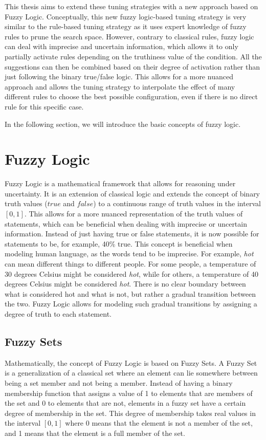 This thesis aims to extend these tuning strategies with a new approach based on Fuzzy Logic. Conceptually, this new fuzzy logic-based tuning strategy is very similar to the rule-based tuning strategy as it uses expert knowledge of fuzzy rules to prune the search space. However, contrary to classical rules, fuzzy logic can deal with imprecise and uncertain information, which allows it to only partially activate rules depending on the truthiness value of the condition.
All the suggestions can then be combined based on their degree of activation rather than just following the binary true/false logic. This allows for a more nuanced approach and allows the tuning strategy to interpolate the effect of many different rules to choose the best possible configuration, even if there is no direct rule for this specific case.

In the following section, we will introduce the basic concepts of fuzzy logic.


\section{Fuzzy Logic}

Fuzzy Logic is a mathematical framework that allows for reasoning under uncertainty. It is an extension of classical logic and extends the concept of binary truth values ($true$ and $false$) to a continuous range of truth values in the interval $[0, 1]$. This allows for a more nuanced representation of the truth values of statements, which can be beneficial when dealing with imprecise or uncertain information. Instead of just having true or false statements, it is now possible for statements to be, for example, 40\% true. This concept is beneficial when modeling human language, as the words tend to be imprecise. For example, \emph{hot} can mean different things to different people. For some people, a temperature of 30 degrees Celsius might be considered \emph{hot}, while for others, a temperature of 40 degrees Celsius might be considered \emph{hot}. There is no clear boundary between what is considered hot and what is not, but rather a gradual transition between the two. Fuzzy Logic allows for modeling such gradual transitions by assigning a degree of truth to each statement.

\subsection{Fuzzy Sets}

Mathematically, the concept of Fuzzy Logic is based on Fuzzy Sets. A Fuzzy Set is a generalization of a classical set where an element can lie somewhere between being a set member and not being a member. Instead of having a binary membership function that assigns a value of 1 to elements that are members of the set and 0 to elements that are not, elements in a fuzzy set have a certain degree of membership in the set. This degree of membership takes real values in the interval $[0, 1]$ where 0 means that the element is not a member of the set, and 1 means that the element is a full member of the set.

